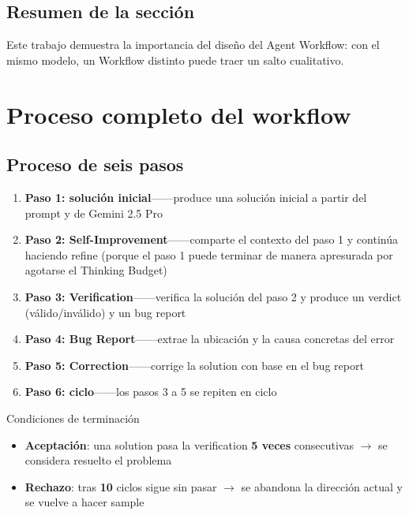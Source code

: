 \documentclass[a4paper]{article}
\begin{document}
\subsection{Resumen de la sección}

Este trabajo demuestra la importancia del diseño del Agent Workflow: con el mismo modelo, un Workflow distinto puede traer un salto cualitativo.

\section{Proceso completo del workflow}

\subsection{Proceso de seis pasos}

\begin{enumerate}
    \item \textbf{Paso 1: solución inicial}——produce una solución inicial a partir del prompt y de Gemini 2.5 Pro
    \item \textbf{Paso 2: Self-Improvement}——comparte el contexto del paso 1 y continúa haciendo refine (porque el paso 1 puede terminar de manera apresurada por agotarse el Thinking Budget)
    \item \textbf{Paso 3: Verification}——verifica la solución del paso 2 y produce un verdict (válido/inválido) y un bug report
    \item \textbf{Paso 4: Bug Report}——extrae la ubicación y la causa concretas del error
    \item \textbf{Paso 5: Correction}——corrige la solution con base en el bug report
    \item \textbf{Paso 6: ciclo}——los pasos 3 a 5 se repiten en ciclo
\end{enumerate}

\begin{importantbox}{Condiciones de terminación}
\begin{itemize}
    \item \textbf{Aceptación}: una solution pasa la verification \textbf{5 veces} consecutivas $\rightarrow$ se considera resuelto el problema
    \item \textbf{Rechazo}: tras \textbf{10} ciclos sigue sin pasar $\rightarrow$ se abandona la dirección actual y se vuelve a hacer sample
\end{itemize}
\end{importantbox}
\end{document}

